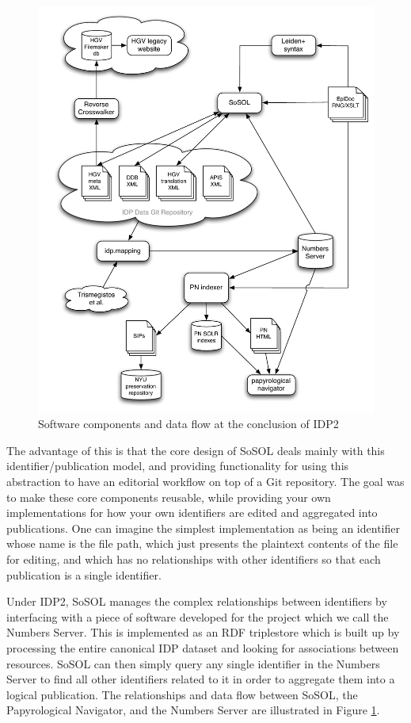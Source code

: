 \documentclass[]{article}
\begin{document}
\begin{figure}[!h]
  \centering
  \includegraphics[width=\textwidth]{images/TopLevelDataFlow4Proposal-HAC.pdf}
  \caption{Software components and data flow at the conclusion of IDP2\label{dataflow}}
\end{figure}

The advantage of this is that the core design of SoSOL deals mainly with this identifier/publication model, and providing functionality for using this abstraction to have an editorial workflow on top of a Git repository. The goal was to make these core components reusable, while providing your own implementations for how your own identifiers are edited and aggregated into publications. One can imagine the simplest implementation as being an identifier whose name is the file path, which just presents the plaintext contents of the file for editing, and which has no relationships with other identifiers so that each publication is a single identifier.

Under IDP2, SoSOL manages the complex relationships between identifiers by interfacing with a piece of software developed for the project which we call the Numbers Server. This is implemented as an RDF triplestore which is built up by processing the entire canonical IDP dataset and looking for associations between resources. SoSOL can then simply query any single identifier in the Numbers Server to find all other identifiers related to it in order to aggregate them into a logical publication. The relationships and data flow between SoSOL, the Papyrological Navigator, and the Numbers Server are illustrated in Figure \ref{dataflow}.
\end{document}
